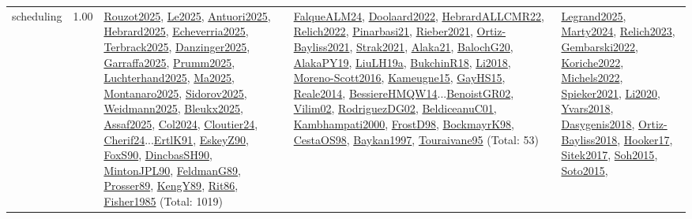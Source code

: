 {\begin{longtable}{p{3cm}r>{\raggedright\arraybackslash}p{6cm}>{\raggedright\arraybackslash}p{6cm}>{\raggedright\arraybackslash}p{8cm}}
\index{scheduling}\index{Scheduling!scheduling}scheduling &  1.00 & \hyperref[detail:Rouzot2025]{Rouzot2025}, \hyperref[detail:Le2025]{Le2025}, \hyperref[detail:Antuori2025]{Antuori2025}, \hyperref[detail:Hebrard2025]{Hebrard2025}, \hyperref[detail:Echeverria2025]{Echeverria2025}, \hyperref[detail:Terbrack2025]{Terbrack2025}, \hyperref[detail:Danzinger2025]{Danzinger2025}, \hyperref[detail:Garraffa2025]{Garraffa2025}, \hyperref[detail:Prumm2025]{Prumm2025}, \hyperref[detail:Luchterhand2025]{Luchterhand2025}, \hyperref[detail:Ma2025]{Ma2025}, \hyperref[detail:Montanaro2025]{Montanaro2025}, \hyperref[detail:Sidorov2025]{Sidorov2025}, \hyperref[detail:Weidmann2025]{Weidmann2025}, \hyperref[detail:Bleukx2025]{Bleukx2025}, \hyperref[detail:Assaf2025]{Assaf2025}, \hyperref[detail:Col2024]{Col2024}, \hyperref[detail:Cloutier24]{Cloutier24}, \hyperref[detail:Cherif24]{Cherif24}...\hyperref[detail:ErtlK91]{ErtlK91}, \hyperref[detail:EskeyZ90]{EskeyZ90}, \hyperref[detail:FoxS90]{FoxS90}, \hyperref[detail:DincbasSH90]{DincbasSH90}, \hyperref[detail:MintonJPL90]{MintonJPL90}, \hyperref[detail:FeldmanG89]{FeldmanG89}, \hyperref[detail:Prosser89]{Prosser89}, \hyperref[detail:KengY89]{KengY89}, \hyperref[detail:Rit86]{Rit86}, \hyperref[detail:Fisher1985]{Fisher1985} (Total: 1019) & \hyperref[detail:FalqueALM24]{FalqueALM24}, \hyperref[detail:Doolaard2022]{Doolaard2022}, \hyperref[detail:HebrardALLCMR22]{HebrardALLCMR22}, \hyperref[detail:Relich2022]{Relich2022}, \hyperref[detail:Pinarbasi21]{Pinarbasi21}, \hyperref[detail:Rieber2021]{Rieber2021}, \hyperref[detail:Ortiz-Bayliss2021]{Ortiz-Bayliss2021}, \hyperref[detail:Strak2021]{Strak2021}, \hyperref[detail:Alaka21]{Alaka21}, \hyperref[detail:BalochG20]{BalochG20}, \hyperref[detail:AlakaPY19]{AlakaPY19}, \hyperref[detail:LiuLH19a]{LiuLH19a}, \hyperref[detail:BukchinR18]{BukchinR18}, \hyperref[detail:Li2018]{Li2018}, \hyperref[detail:Moreno-Scott2016]{Moreno-Scott2016}, \hyperref[detail:Kameugne15]{Kameugne15}, \hyperref[detail:GayHS15]{GayHS15}, \hyperref[detail:Reale2014]{Reale2014}, \hyperref[detail:BessiereHMQW14]{BessiereHMQW14}...\hyperref[detail:BenoistGR02]{BenoistGR02}, \hyperref[detail:Vilim02]{Vilim02}, \hyperref[detail:RodriguezDG02]{RodriguezDG02}, \hyperref[detail:BeldiceanuC01]{BeldiceanuC01}, \hyperref[detail:Kambhampati2000]{Kambhampati2000}, \hyperref[detail:FrostD98]{FrostD98}, \hyperref[detail:BockmayrK98]{BockmayrK98}, \hyperref[detail:CestaOS98]{CestaOS98}, \hyperref[detail:Baykan1997]{Baykan1997}, \hyperref[detail:Touraivane95]{Touraivane95} (Total: 53) & \hyperref[detail:Legrand2025]{Legrand2025}, \hyperref[detail:Marty2024]{Marty2024}, \hyperref[detail:Relich2023]{Relich2023}, \hyperref[detail:Gembarski2022]{Gembarski2022}, \hyperref[detail:Koriche2022]{Koriche2022}, \hyperref[detail:Michels2022]{Michels2022}, \hyperref[detail:Spieker2021]{Spieker2021}, \hyperref[detail:Li2020]{Li2020}, \hyperref[detail:Yvars2018]{Yvars2018}, \hyperref[detail:Dasygenis2018]{Dasygenis2018}, \hyperref[detail:Ortiz-Bayliss2018]{Ortiz-Bayliss2018}, \hyperref[detail:Hooker17]{Hooker17}, \hyperref[detail:Sitek2017]{Sitek2017}, \hyperref[detail:Soh2015]{Soh2015}, \hyperref[detail:Soto2015]{Soto2015}, 
\end{longtable}}
